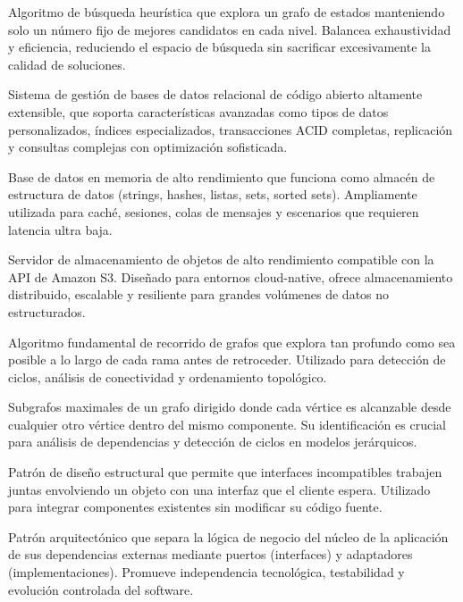 \begin{description}[style=nextline,leftmargin=0pt]
    \item[Beam Search]
    Algoritmo de búsqueda heurística que explora un grafo de estados manteniendo solo un número fijo de mejores candidatos en cada nivel. Balancea exhaustividad y eficiencia, reduciendo el espacio de búsqueda sin sacrificar excesivamente la calidad de soluciones.
    
    \item[PostgreSQL]
    Sistema de gestión de bases de datos relacional de código abierto altamente extensible, que soporta características avanzadas como tipos de datos personalizados, índices especializados, transacciones ACID completas, replicación y consultas complejas con optimización sofisticada.
    
    \item[Redis]
    Base de datos en memoria de alto rendimiento que funciona como almacén de estructura de datos (strings, hashes, listas, sets, sorted sets). Ampliamente utilizada para caché, sesiones, colas de mensajes y escenarios que requieren latencia ultra baja.
    
    \item[MinIO]
    Servidor de almacenamiento de objetos de alto rendimiento compatible con la API de Amazon S3. Diseñado para entornos cloud-native, ofrece almacenamiento distribuido, escalable y resiliente para grandes volúmenes de datos no estructurados.
    
    \item[Búsqueda en Profundidad (\textit{Depth-First Search})]
    Algoritmo fundamental de recorrido de grafos que explora tan profundo como sea posible a lo largo de cada rama antes de retroceder. Utilizado para detección de ciclos, análisis de conectividad y ordenamiento topológico.
    
    \item[Componentes Fuertemente Conexas (\textit{Strongly Connected Components})]
    Subgrafos maximales de un grafo dirigido donde cada vértice es alcanzable desde cualquier otro vértice dentro del mismo componente. Su identificación es crucial para análisis de dependencias y detección de ciclos en modelos jerárquicos.
    
    \item[Adapter (Adaptador)]
    Patrón de diseño estructural que permite que interfaces incompatibles trabajen juntas envolviendo un objeto con una interfaz que el cliente espera. Utilizado para integrar componentes existentes sin modificar su código fuente.
    
    \item[Arquitectura Hexagonal]
    Patrón arquitectónico que separa la lógica de negocio del núcleo de la aplicación de sus dependencias externas mediante puertos (interfaces) y adaptadores (implementaciones). Promueve independencia tecnológica, testabilidad y evolución controlada del software.
    

\end{description}
